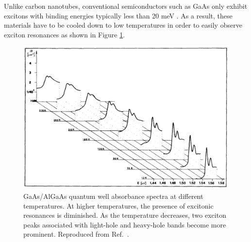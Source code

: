 Unlike carbon nanotubes, conventional semiconductors such as GaAs only exhibit excitons with binding energies typically less than 20 meV \cite{liang1970excitons}.  As a result, these materials have to be cooled down to low temperatures in order to easily observe exciton resonances as shown in Figure \ref{fig:gaas_vs_cnt_absorbance}.

\begin{figure}[h]
	\centering
	\includegraphics[scale=0.55]{images/chapter_optical_props/gaas_absorbance_filipowicz}
	\caption{GaAs/AlGaAs quantum well absorbance spectra at different temperatures. At higher temperatures, the presence of excitonic resonances is diminished. As the temperature decreases, two exciton peaks associated with light-hole and heavy-hole bands become more prominent. Reproduced from Ref.\ \cite{filipowicz1990temperature}.}
	\label{fig:gaas_vs_cnt_absorbance}
\end{figure}




